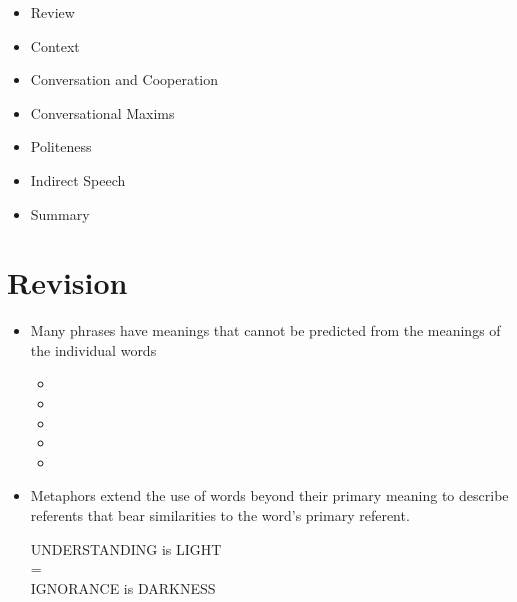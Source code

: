 \documentclass[a4paper,landscape,headrule,footrule,xetex]{foils}
\begin{document}
\maketitle

%



\begin{itemize}
\item Review
\item Context
\item Conversation and Cooperation
\item Conversational Maxims
\item Politeness
\item Indirect Speech
\item Summary

\end{itemize}

\section{Revision}

\begin{itemize}
\item Many phrases have meanings that cannot be predicted from the meanings of the individual words
  \begin{itemize}
  \item {}
  \item {}
  \item {}
  \item {}
  \item {}
  \end{itemize}
\item Metaphors extend the use of words beyond their primary meaning
  to describe referents that bear similarities to the word's primary
  referent.
\begin{exe}
  \ex {}
\end{exe}
\begin{center}
UNDERSTANDING is LIGHT \\ = \\ IGNORANCE is DARKNESS
\end{center}
\end{itemize}
\end{document}

